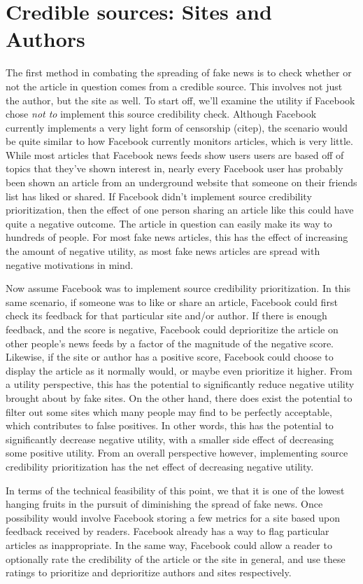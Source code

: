 \documentclass[12pt]{article}
\begin{document}
\section{Credible sources: Sites and Authors}
The first method in combating the spreading of fake news is to check whether or not the article in question comes from a credible source. This involves not just the author, but the site as well. To start off, we'll examine the utility if Facebook chose \textit{not to} implement this source credibility check. Although Facebook currently implements a very light form of censorship (citep), the scenario would be quite similar to how Facebook currently monitors articles, which is very little. While most articles that Facebook news feeds show users users are based off of topics that they've shown interest in, nearly every Facebook user has probably been shown an article from an underground website that someone on their friends list has liked or shared. If Facebook didn't implement source credibility prioritization, then the effect of one person sharing an article like this could have quite a negative outcome. The article in question can easily make its way to hundreds of people. For most fake news articles, this has the effect of increasing the amount of negative utility, as most fake news articles are spread with negative motivations in mind.

Now assume Facebook was to implement source credibility prioritization. In this same scenario, if someone was to like or share an article, Facebook could first check its feedback for that particular site and/or author. If there is enough feedback, and the score is negative, Facebook could deprioritize the article on other people's news feeds by a factor of the magnitude of the negative score. Likewise, if the site or author has a positive score, Facebook could choose to display the article as it normally would, or maybe even prioritize it higher. From a utility perspective, this has the potential to significantly reduce negative utility brought about by fake sites. On the other hand, there does exist the potential to filter out some sites which many people may find to be perfectly acceptable, which contributes to false positives. In other words, this has the potential to significantly decrease negative utility, with a smaller side effect of decreasing some positive utility. From an overall perspective however, implementing source credibility prioritization has the net effect of decreasing negative utility.

In terms of the technical feasibility of this point, we that it is one of the lowest hanging fruits in the pursuit of diminishing the spread of fake news. Once possibility would involve Facebook storing a few metrics for a site based upon feedback received by readers. Facebook already has a way to flag particular articles as inappropriate. In the same way, Facebook could allow a reader to optionally rate the credibility of the article or the site in general, and use these ratings to prioritize and deprioritize authors and sites respectively. 
\end{document}
